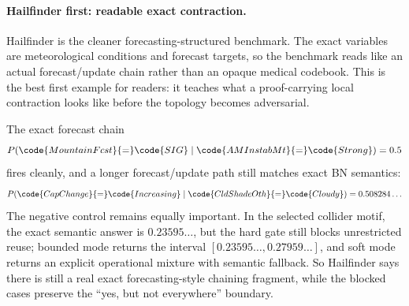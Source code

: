 \documentclass[11pt,openany]{report}
\begin{document}
\paragraph{Hailfinder first: readable exact contraction.}
Hailfinder is the cleaner forecasting-structured benchmark.  The exact
variables are meteorological conditions and forecast targets, so the
benchmark reads like an actual forecast/update chain rather than an
opaque medical codebook.  This is the best first example for readers:
it teaches what a proof-carrying local contraction looks like before the
topology becomes adversarial.
\par
The exact forecast chain
\[
  P(\code{MountainFcst}{=}\code{SIG} \mid
    \code{AMInstabMt}{=}\code{Strong}) = 0.5
\]
fires cleanly, and a longer forecast/update path still matches exact BN
semantics:
\[
  P(\code{CapChange}{=}\code{Increasing} \mid
    \code{CldShadeOth}{=}\code{Cloudy}) = 0.508284\ldots
\]
The negative control remains equally important.  In the selected
collider motif, the exact semantic answer is $0.23595\ldots$, but the
hard gate still blocks unrestricted reuse; bounded mode returns the
interval $[0.23595\ldots, 0.27959\ldots]$, and soft mode returns an
explicit operational mixture with semantic fallback.  So Hailfinder says
there is still a real exact forecasting-style chaining fragment, while
the blocked cases preserve the ``yes, but not everywhere'' boundary.
\end{document}
